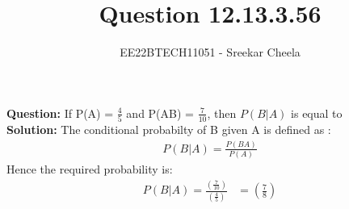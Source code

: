 \documentclass[journal,12pt,twocolumn]{IEEEtran}
\providecommand{\brak}[1]{\ensuremath{\left(#1\right)}}
\theoremstyle{remark}
\begin{document}
%




\vspace{3cm}


\title{Question 12.13.3.56}
\author{EE22BTECH11051 - Sreekar Cheela}

\maketitle
\vspace{3cm}

\textbf{Question:}
If P(A) = $\frac{4}{5}$ and P(AB) = $\frac{7}{10}$, then $P(B|A)$ is equal to\\
\textbf{Solution:}
\fi
The conditional probabilty of B given A is defined as :
\begin{align}
    P(B|A) = \frac{P(BA)}{P(A)}
\end{align}
Hence the required probability is:
\begin{align}
    P(B|A) = \frac{\brak{\frac{7}{10}}}{\brak{\frac{4}{5}}}
           &= \brak{\frac{7}{8}}
\end{align}
\end{document}
